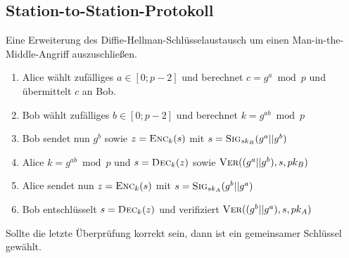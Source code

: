 \documentclass[8pt,a4paper,landscape]{article}
\newcommand{\skey}{\ensuremath{sk}}
\newcommand{\pkey}{\ensuremath{pk}}
\newcommand{\enc}{\textsc{Enc}}
\newcommand{\dec}{\textsc{Dec}}
\newcommand{\sig}{\textsc{Sig}}
\newcommand{\ver}{\textsc{Ver}}
\begin{document}
\begin{multicols*}{4}
 \subsection{Station-to-Station-Protokoll}
 Eine Erweiterung des Diffie-Hellman-Schlüsselaustausch um einen 
 Man-in-the-Middle-Angriff auszuschließen.
 \begin{enumerate}
  \item Alice wählt zufälliges $a \in [0;p-2]$ und berechnet $c = g^{a} \bmod p$
  und übermittelt $c$ an Bob.
  \item Bob wählt zufälliges $b \in [0;p-2]$ und berechnet $k = g^{ab} \bmod p$
  \item Bob sendet nun $g^{b}$ sowie $z = \enc_{k}(s)$ mit $s = \sig_{\skey_{B}}(g^{a}||g^{b})$
  \item Alice $k = g^{ab} \bmod p$ und $s = \dec_{k}(z)$ sowie $\ver((g^{a}||g^{b}),s,\pkey_{B})$
  \item Alice sendet nun $z = \enc_{k}(s)$ mit $s = \sig_{\skey_{A}}(g^{b}||g^{a})$
  \item Bob entschlüsselt $s = \dec_{k}(z)$ und verifiziert $\ver((g^{b}||g^{a}),s,\pkey_{A})$
 \end{enumerate}
 Sollte die letzte Überprüfung korrekt sein, dann ist ein gemeinsamer Schlüssel gewählt.
  
\end{multicols*}
\end{document}
